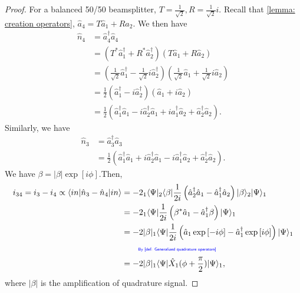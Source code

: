 \documentclass[../../note.tex]{subfiles}
\begin{document}
\begin{proof}
    For a balanced 50/50 beamsplitter, $T = \frac{1}{\sqrt{2}}, R = \frac{1}{\sqrt{2}} i$. Recall that \ref{lemma: creation operators}, $\hat{a}_4 = T \hat{a}_1 + R \hat{a}_2$. We then have
    \begin{align}
        \hat{n}_4
        &= \hat{a}_4^\dagger \hat{a}_4 \\
        &= (T^\ast \hat{a}_1^\dagger + R^\ast \hat{a}_2^\dagger)(T \hat{a}_1 + R \hat{a}_2)\\
        &= (\frac{1}{\sqrt{2}} \hat{a}_1^\dagger - \frac{1}{\sqrt{2}} i \hat{a}_2^\dagger)(\frac{1}{\sqrt{2}} \hat{a}_1 + \frac{1}{\sqrt{2}} i \hat{a}_2) \\
        &= \frac{1}{2} (\hat{a}_1^\dagger - i \hat{a}_2^\dagger)(\hat{a}_1 + i \hat{a}_2) \\
        &= \frac{1}{2}(\hat{a}_1^\dagger \hat{a}_1 - i \hat{a}_2^\dagger \hat{a}_1 + i \hat{a}_1^\dagger \hat{a}_2 + \hat{a}_2^\dagger \hat{a}_2).
    \end{align}
    Similarly, we have
    \begin{align}
        \hat{n}_3 
        &= \hat{a}_3^\dagger \hat{a}_3 \\
        &= \frac{1}{2}(\hat{a}_1^\dagger \hat{a}_1 + i \hat{a}_2^\dagger \hat{a}_1 - i \hat{a}_1^\dagger \hat{a}_2 + \hat{a}_2^\dagger \hat{a}_2).
    \end{align}
    We have $\beta = \vert \beta \vert \exp\left[i \phi\right]$.Then,
    \begin{align}
        i_{34} = i_3 -i_4 \propto \langle in \vert \hat{n}_3 - \hat{n}_4 \vert in \rangle 
        &= -2 _1\langle \Psi \vert _2\langle \beta \vert \frac{1}{2 i} \left(\hat{a}_2^\dagger \hat{a}_1 - \hat{a}_1^\dagger \hat{a}_2\right) \vert \beta \rangle_2 \vert \Psi \rangle_1 \\
        &= -2 _1 \langle \Psi \vert \frac{1}{2 i} \left(\beta^\ast \hat{a}_1 - \hat{a}_1^\dagger \beta \right) \vert \Psi \rangle_1 \\
        &=  -2 \vert \beta \vert _1 \langle \Psi \vert \frac{1}{2 i} \left(\hat{a}_1 \exp\left[-i \phi \right] - \hat{a}_1^\dagger \exp\left[i \phi\right] \right) \vert \Psi \rangle_1 \\
        &\qquad\text{\color{blue}{\tiny\sffamily By \ref{def: Generalized  quadrature operators}}} \nonumber \\
        &= -2 \vert \beta \vert _1\langle \Psi \vert \hat{X}_1(\phi + \frac{\pi}{2}) \vert \Psi \rangle_1, 
    \end{align}
    where $\vert \beta \vert$ is the amplification of quadrature signal.
\end{proof}
\end{document}
